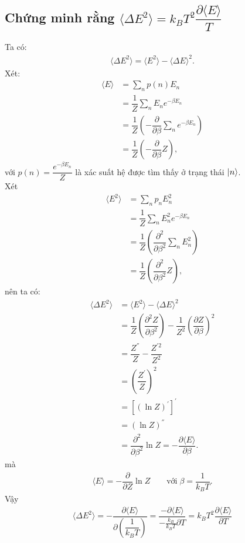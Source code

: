 \documentclass{article}
\newcommand{\f}[2]{\dfrac{#1}{#2}}
\begin{document}
\subsection*{Chứng minh rằng $\langle \Delta E^2 \rangle = k_B T^2 \f{\partial \langle E \rangle}{T}$}
Ta có:
\begin{align*}
	\langle \Delta E^2 \rangle = \langle E^2 \rangle - \langle \Delta E \rangle^2.
\end{align*}
Xét:
\begin{align*}
	\langle E \rangle 
	&= \sum_{n} p(n) E_{n} \\
	&= \f{1}{Z} \sum_{n} E_{n} e^{-\beta E_{n}} \\
	&= \f{1}{Z} \left( -\f{\partial}{\partial \beta} \sum_{n}e^{-\beta E_{n}} 
	\right)\\
	&= \f{1}{Z} \left( -\f{\partial}{\partial \beta} Z \right),
\end{align*}
với $p(n) = \f{e^{-\beta E_{n}}}{Z}$ là xác suất hệ được tìm thấy ở trạng thái $\ket{n}$. \\
Xét
\begin{align*}
	\langle E^2 \rangle
	&= \sum_{n} p_{n} E_{n}^{2} \\
	&= \f{1}{Z} \sum_{n} E_{n}^{2} e^{-\beta E_{n}} \\
	&= \f{1}{Z} \left( \f{\partial^2}{\partial \beta^2} \sum_{n} E_{n}^{2} \right) \\
	&= \f{1}{Z} \left( \f{\partial^2}{\partial \beta^2} Z\right),
\end{align*}
nên ta có:
\begin{align*}
	\langle \Delta E^2 \rangle 
	&= \langle E^2 \rangle - \langle \Delta E \rangle^2 \\
	&= \f{1}{Z} \left( \f{\partial^2 Z}{\partial \beta^2} \right) - \f{1}{Z^2} \left( \f{\partial Z}{\partial \beta} \right)^2 \\
	&= \f{Z^{''}}{Z} - \f{Z^{'2}}{Z^2} \\
	&= \left(\f{Z^{'}}{Z}\right)^2 \\
	&= \left[ (\ln Z)^{'} \right]^{'} \\
	&= \left( \ln Z \right)^{''} \\
	&= \f{\partial^2}{\partial \beta^2} \ln Z = -\f{\partial \langle E \rangle}{\partial \beta}.
\end{align*}
mà
\begin{align*}
	\langle E \rangle = -\f{\partial}{\partial Z} \ln Z \quad \quad \text{với}\; \beta = \f{1}{k_{B}T}.
\end{align*}
Vậy
\begin{align*}
	\langle \Delta E^2 \rangle = -\f{\partial \langle E \rangle}{\partial \left( \f{1}{k_{B}T}\right)} = \f{-\partial \langle E \rangle}{-\frac{k_{B}}{k_{B}T}\partial T} = k_{B} T^2 \f{\partial \langle E \rangle}{\partial T}
\end{align*}
\end{document}
